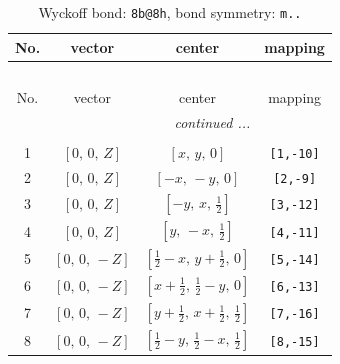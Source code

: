 \documentclass[fleqn,8pt]{jsarticle}
\begin{document}
\begin{longtable}{cccc}
\caption{Wyckoff bond: {\tt 8b@8h}, bond symmetry: {\tt m..}}
 \\
 \hline \hline
No. & vector & center & mapping \\ \hline \endfirsthead

\multicolumn{3}{l}{\tablename\ \thetable{}} \\
 \hline \hline
No. & vector & center & mapping \\ \hline \endhead

 \hline \hline
\multicolumn{3}{r}{\footnotesize\it continued ...} \\ \endfoot

 \hline \hline
\multicolumn{3}{r}{} \\ \endlastfoot

1 & $\left[ 0,\, 0,\, Z \right]$ & $\left[ x,\, y,\, 0 \right]$ & {\tt [1,-10]} \\ \hline
2 & $\left[ 0,\, 0,\, Z \right]$ & $\left[ - x,\, - y,\, 0 \right]$ & {\tt [2,-9]} \\ \hline
3 & $\left[ 0,\, 0,\, Z \right]$ & $\left[ - y,\, x,\, \frac{1}{2} \right]$ & {\tt [3,-12]} \\ \hline
4 & $\left[ 0,\, 0,\, Z \right]$ & $\left[ y,\, - x,\, \frac{1}{2} \right]$ & {\tt [4,-11]} \\ \hline
5 & $\left[ 0,\, 0,\, - Z \right]$ & $\left[ \frac{1}{2} - x,\, y + \frac{1}{2},\, 0 \right]$ & {\tt [5,-14]} \\ \hline
6 & $\left[ 0,\, 0,\, - Z \right]$ & $\left[ x + \frac{1}{2},\, \frac{1}{2} - y,\, 0 \right]$ & {\tt [6,-13]} \\ \hline
7 & $\left[ 0,\, 0,\, - Z \right]$ & $\left[ y + \frac{1}{2},\, x + \frac{1}{2},\, \frac{1}{2} \right]$ & {\tt [7,-16]} \\ \hline
8 & $\left[ 0,\, 0,\, - Z \right]$ & $\left[ \frac{1}{2} - y,\, \frac{1}{2} - x,\, \frac{1}{2} \right]$ & {\tt [8,-15]} \\
\end{longtable}
\renewcommand{\arraystretch}{1.2}
\end{document}
